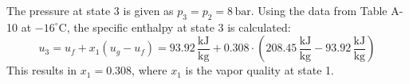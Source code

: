 The pressure at state 3 is given as \( p_3 = p_2 = 8 \, \text{bar} \). Using the data from Table A-10 at \( -16^\circ\text{C} \), the specific enthalpy at state 3 is calculated:  
\[
u_3 = u_f + x_1(u_g - u_f) = 93.92 \, \frac{\text{kJ}}{\text{kg}} + 0.308 \cdot (208.45 \, \frac{\text{kJ}}{\text{kg}} - 93.92 \, \frac{\text{kJ}}{\text{kg}})
\]  
This results in \( x_1 = 0.308 \), where \( x_1 \) is the vapor quality at state 1.